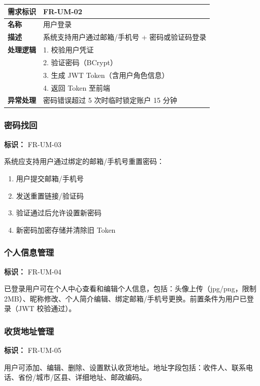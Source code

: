 \documentclass[12pt,a4paper,UTF8]{ctexart}
\begin{document}
\begin{longtable}{p{}|p{}}
    \toprule
    \textbf{需求标识} & FR-UM-02 \\
    \midrule
    \textbf{名称} & 用户登录 \\
    \midrule
    \textbf{描述} & 系统支持用户通过邮箱/手机号 + 密码或验证码登录 \\
    \midrule
    \textbf{处理逻辑} & 
    1. 校验用户凭证 \\
    & 2. 验证密码（BCrypt） \\
    & 3. 生成 JWT Token（含用户角色信息） \\
    & 4. 返回 Token 至前端 \\
    \midrule
    \textbf{异常处理} & 密码错误超过 5 次时临时锁定账户 15 分钟 \\
    \bottomrule
\end{longtable}

\subsubsection{密码找回}

\textbf{标识：} FR-UM-03

系统应支持用户通过绑定的邮箱/手机号重置密码：
\begin{enumerate}[itemsep=3pt]
    \item 用户提交邮箱/手机号
    \item 发送重置链接/验证码
    \item 验证通过后允许设置新密码
    \item 新密码加密存储并清除旧 Token
\end{enumerate}

\subsubsection{个人信息管理}

\textbf{标识：} FR-UM-04

已登录用户可在个人中心查看和编辑个人信息，包括：头像上传（jpg/png，限制2MB）、昵称修改、个人简介编辑、绑定邮箱/手机号更换。前置条件为用户已登录（JWT 校验通过）。

\subsubsection{收货地址管理}

\textbf{标识：} FR-UM-05

用户可添加、编辑、删除、设置默认收货地址。地址字段包括：收件人、联系电话、省份/城市/区县、详细地址、邮政编码。
\end{document}
